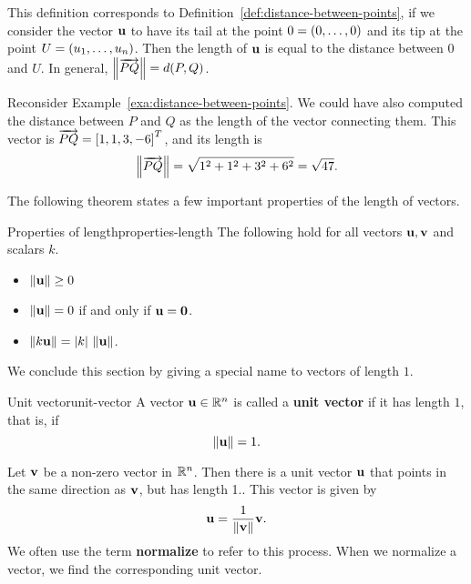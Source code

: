 This definition corresponds to Definition~\ref{def:distance-between-points}, if we consider the vector $\mbox{\bf u}$
to have its tail at the point $0 = \left(0,\ldots,0 \right)$ and its tip at
the point $U = \left(u_1,\ldots, u_n \right)$.  Then the length of
$\mbox{\bf u}$ is equal to the distance between $0$ and $U$. In general,
$\left\|\overrightarrow{PQ}\right\| = d(P,Q)$.

Reconsider Example~\ref{exa:distance-between-points}. We could have also
computed the distance between $P$ and $Q$ as the length of the vector
connecting them. This vector is $\overrightarrow{PQ} = \left[1,1,3,-6\right]^T$,
and its length is
\[
  \left\|\overrightarrow{PQ}\right\| = \sqrt{1^2+1^2+3^2+6^2} = \sqrt{47}.
\]

The following theorem states a few important properties of the length
of vectors.

\begin{theorem}{Properties of length}{properties-length}
  The following hold for all vectors $\mbox{\bf u},\mbox{\bf v}$ and scalars $k$.
  \begin{itemize}
  \item $\left\|\mbox{\bf u}\right\|\geq 0$
  \item $\left\|\mbox{\bf u}\right\|=0$ if and only if $\mbox{\bf u}=\mbox{\bf 0}$.
  \item $\left\|k\mbox{\bf u}\right\| = |k|\,\left\|\mbox{\bf u}\right\|$.
  \end{itemize}
\end{theorem}

We conclude this section by giving a special name to vectors of length
$1$.

\begin{definition}{Unit vector}{unit-vector}
  A vector\/ $\mbox{\bf u}\in\mathbb{R}^n$ is called a
  \textbf{unit vector} if it has
  length $1$, that is, if
  \begin{equation*}
    \left\|\mbox{\bf u}\right\| = 1.
  \end{equation*}
\end{definition}

Let $\mbox{\bf v}$ be a non-zero vector in $\mathbb{R}^{n}$. Then there is a unit
vector $\mbox{\bf u}$ that points in the same direction as $\mbox{\bf v}$, but
has length 1.. This vector is
given by
\begin{equation*}
\mbox{\bf u} = \frac{1}{\left\|\mbox{\bf v}\right\|} \mbox{\bf v}.
\end{equation*}
We often use the term \textbf{normalize}
to refer to this process. When we normalize a vector, we find the
corresponding unit vector.

